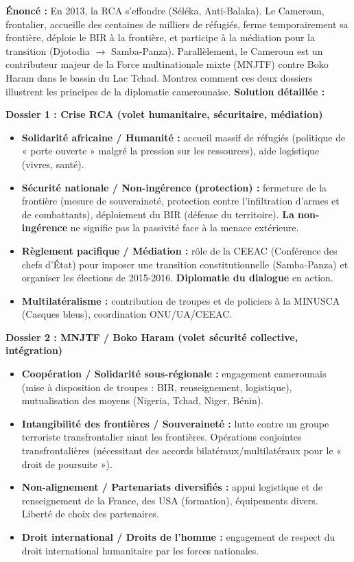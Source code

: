 \documentclass[11pt]{article}
\begin{document}
\begin{exoresolu}
\textbf{Énoncé :} En 2013, la RCA s'effondre (Séléka, Anti-Balaka). Le Cameroun, frontalier, accueille des centaines de milliers de réfugiés, ferme temporairement sa frontière, déploie le BIR à la frontière, et participe à la médiation pour la transition (Djotodia $\rightarrow$ Samba-Panza). Parallèlement, le Cameroun est un contributeur majeur de la Force multinationale mixte (MNJTF) contre Boko Haram dans le bassin du Lac Tchad. Montrez comment ces deux dossiers illustrent les principes de la diplomatie camerounaise.
\tcblower
\textbf{Solution détaillée :}

\textbf{Dossier 1 : Crise RCA (volet humanitaire, sécuritaire, médiation)}
\begin{itemize}
    \item \textbf{Solidarité africaine / Humanité :} accueil massif de réfugiés (politique de « porte ouverte » malgré la pression sur les ressources), aide logistique (vivres, santé).
    \item \textbf{Sécurité nationale / Non-ingérence (protection) :} fermeture de la frontière (mesure de souveraineté, protection contre l'infiltration d'armes et de combattants), déploiement du BIR (défense du territoire). \textbf{La non-ingérence} ne signifie pas la passivité face à la menace extérieure.
    \item \textbf{Règlement pacifique / Médiation :} rôle de la CEEAC (Conférence des chefs d'État) pour imposer une transition constitutionnelle (Samba-Panza) et organiser les élections de 2015-2016. \textbf{Diplomatie du dialogue} en action.
    \item \textbf{Multilatéralisme :} contribution de troupes et de policiers à la MINUSCA (Casques bleus), coordination ONU/UA/CEEAC.
\end{itemize}

\textbf{Dossier 2 : MNJTF / Boko Haram (volet sécurité collective, intégration)}
\begin{itemize}
    \item \textbf{Coopération / Solidarité sous-régionale :} engagement camerounais (mise à disposition de troupes : BIR, renseignement, logistique), mutualisation des moyens (Nigeria, Tchad, Niger, Bénin).
    \item \textbf{Intangibilité des frontières / Souveraineté :} lutte contre un groupe terroriste transfrontalier niant les frontières. Opérations conjointes transfrontalières (nécessitant des accords bilatéraux/multilatéraux pour le « droit de poursuite »).
    \item \textbf{Non-alignement / Partenariats diversifiés :} appui logistique et de renseignement de la France, des USA (formation), équipements divers. Liberté de choix des partenaires.
    \item \textbf{Droit international / Droits de l'homme :} engagement de respect du droit international humanitaire par les forces nationales.
\end{itemize}


\end{exoresolu}
\end{document}
